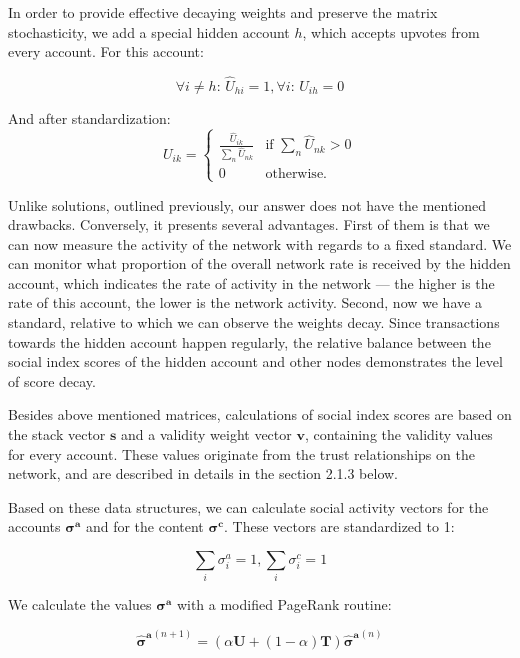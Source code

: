\documentclass[a4paper,12pt]{article}
\begin{document}
	In order to provide effective decaying weights and preserve the matrix stochasticity, we add a special hidden account $h$, which accepts upvotes from every account. For this account:
	
	$$
	\forall i \ne h \text{: } \hat{U}_{hi} = 1,
	\forall i  \text{: } \hat{U}_{ih} = 0
	$$
	
	And after standardization:
	$$
U_{ik} = \begin{cases}
 \frac{\hat{U}_{ik}} {\sum_n{\hat{U}_{nk}}} & \text{if $\sum_n{\hat{U}_{nk}}>0$} \\
 0 & \text{otherwise.}
\end{cases}
$$

	Unlike solutions, outlined previously, our answer does not have the mentioned drawbacks. Conversely, it presents several advantages. First of them is that we can now measure the activity of the network with regards to a fixed standard. We can monitor what proportion of the overall network rate is received by the hidden account, which indicates the rate of activity in the network — the higher is the rate of this account, the lower is the network activity. Second, now we have a standard, relative to which we can observe the weights decay. Since transactions towards the hidden account happen regularly, the relative balance between the social index scores of the hidden account and other nodes demonstrates the level of score decay.
	
	Besides above mentioned matrices, calculations of social index scores are based on the stack vector $\boldsymbol{s}$ and a validity weight vector $\boldsymbol{v}$, containing the validity values for every account. These values originate from the trust relationships on the network, and are described in details in the section 2.1.3 below.
	
	Based on these data structures, we can calculate social activity vectors for the accounts $\boldsymbol{\sigma^a}$ and for the content $\boldsymbol{\sigma^c}$. These vectors are standardized to 1:
	
	$$
	\sum_i{\sigma^a_i} = 1, \sum_i{\sigma^c_i} = 1
	$$
		
	
	We calculate the values $\boldsymbol{\sigma^a}$ with a modified PageRank routine:
	
	\begin{equation}
	\label{social_score_pgrank}
	\boldsymbol{\hat{\sigma}^a}^{(n+1)} = (\alpha \boldsymbol{U} + (1 - \alpha) \boldsymbol{T})\boldsymbol{ \hat{\sigma}^a}^{(n)}
	\end{equation}
	
\end{document}
